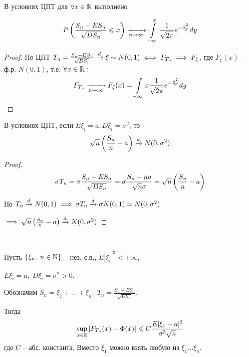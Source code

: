 \begin{corollary}
  В условиях ЦПТ для $\forall x \in \mathbb{R}$ выполнено
  
  \begin{align*}
    P\left( \frac{S_n - E S_n}{\sqrt{D S_n}} \leqslant x \right) 
    \xrightarrow[n \to \infty]{} \int\limits_{-\infty}^{x} \frac{1}{\sqrt{2\pi}} e^{-\frac{y^2}{2}} dy
  \end{align*}

  \begin{proof}
    По ЦПТ $T_n = \frac{S_n - E S_n}{\sqrt{D S_n}} \xrightarrow{d} \xi \sim N(0, 1) 
    \iff F_{T_n} \implies F_{\xi}$, где $F_{\xi} (x)$  -- ф.р. $N(0, 1)$, т.е.
    $\forall x \in \mathbb{R}:$
    \begin{align*}
      F_{T_n} \xrightarrow[n \to \infty]{} F_{\xi} (x) 
      = \int\limits_{-\infty}{x} \frac{1}{\sqrt{2 \pi}} e^{-\frac{y^2}{2}} dy
    \end{align*}
  \end{proof}
\end{corollary}

\begin{corollary}
  В условиях ЦПТ, если $E \xi_i = a, D \xi_i = \sigma^2$, то
  \begin{align*}
    \sqrt{n} \left( \frac{S_n}{n} - a \right) \xrightarrow{d} N(0, \sigma^2)
  \end{align*}

  \begin{proof}
    \begin{align*}
      \sigma T_n = \sigma \frac{S_n - E S_n}{\sqrt{D S_n}} 
      = \sigma \frac{S_n - na}{\sqrt{n} \sigma} = \sqrt{n} \left( \frac{S_n}{n} - a \right)
    \end{align*}

    Но $T_n \xrightarrow{d} N(0, 1) \implies \sigma T_n \xrightarrow{d} \sigma N(0, 1) = N(0, \sigma^2)$

    $\implies \sqrt{n} \left( \frac{S_n}{n} - a \right) \xrightarrow{d} N(0, \sigma^2)$
  \end{proof}
\end{corollary}

\begin{theorem}~

  Пусть $\{ \xi_n,\; n \in \mathbb{N} \}$ -- нез. с.в., $E |\xi_i|^3 < +\infty$,
  
  $E \xi_i = a,\; D \xi_i = \sigma^2 > 0$. 

  Обозначим $S_n = \xi_1 + \ldots + \xi_n, \; T_n = \frac{S_n - E S_n}{\sqrt{D S_n}}$.

  Тогда
  \begin{align*}
    \sup\limits_{x \in \mathbb{R}} |F_{T_n} (x) - \Phi(x)| 
    \leqslant C \frac{E |\xi_1 - a|^3}{\sigma^3 \sqrt{n}}
  \end{align*}
  где $C$ -- абс. константа. Вместо $\xi_1$ можно взять любую из $\xi_1 \ldots \xi_n$.
\end{theorem}

